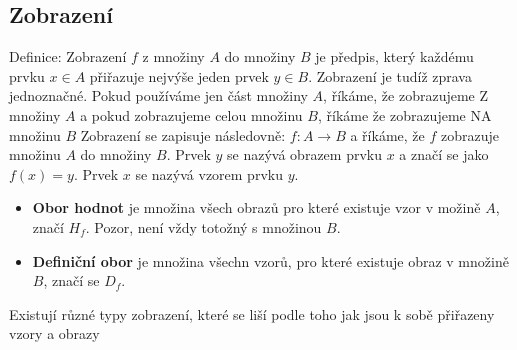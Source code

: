 \documentclass[12pt]{article}
\begin{document}
\subsection*{Zobrazení}
Definice: Zobrazení $f$ z množiny $A$ do množiny $B$ je předpis, který každému prvku $x \in A$ přiřazuje nejvýše jeden prvek $y \in B$. Zobrazení je tudíž zprava jednoznačné. 
Pokud používáme jen část množiny $A$, říkáme, že zobrazujeme Z množiny $A$ a pokud zobrazujeme celou množinu $B$, říkáme že zobrazujeme NA množinu $B$
Zobrazení se zapisuje následovně: $f: A \rightarrow B$ a říkáme, že $f$ zobrazuje množinu $A$ do množiny $B$. Prvek $y$ se nazývá obrazem prvku $x$ a značí se jako $f(x) = y$. Prvek $x$ se nazývá vzorem prvku $y$.
\begin{itemize}[itemsep = 2pt]
    \item \textbf{Obor hodnot} je množina všech obrazů pro které existuje vzor v možině  $A$, značí $H_f$. Pozor, není vždy totožný s množinou $B$.
    \item \textbf{Definiční obor} je množina všechn vzorů, pro které existuje obraz v množině $B$, značí se $D_f$.
\end{itemize}
Existují různé typy zobrazení, které se liší podle toho jak jsou k sobě přiřazeny vzory a obrazy
\end{document}
